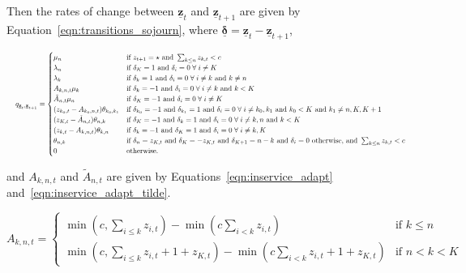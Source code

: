 \documentclass{article}
\begin{document}
Then the rates of change between $\underline{\mathbf{z}}_t$ and
$\underline{\mathbf{z}}_{t+1}$ are given by Equation~\ref{eqn:transitions_sojourn},
where $\underline{\mathbf{\delta}} = \underline{\mathbf{z}}_t - \underline{\mathbf{z}}_{t+1}$,

\begin{equation}\label{eqn:transitions_sojourn}
\resizebox{\textwidth}{!}{%
$q_{\underline{\mathbf{z}}_t, \underline{\mathbf{z}}_{t+1}} = 
\begin{cases}
\mu_n & \text{if } z_{t+1} = \star \text{ and } \sum_{k \leq n} z_{k, t} < c \\
\lambda_n & \text{if } \delta_K = 1 \text{ and } \delta_i = 0 \; \forall \; i \neq K \\
\lambda_k & \text{if } \delta_k = 1 \text{ and } \delta_i = 0 \; \forall \; i \neq k \text{ and } k \neq n\\
A_{k,n,t} \mu_k & \text{if } \delta_k = -1 \text{ and } \delta_i = 0 \; \forall \; i \neq k \text{ and } k < K\\
\tilde{A}_{n,t} \mu_n & \text{if } \delta_K = -1 \text{ and } \delta_i = 0 \; \forall \; i \neq K\\
(z_{k_0,t} - A_{k_0,n,t}) \theta_{k_0,k_1} & \text{if } \delta_{k_0} = -1 \text{ and } \delta_{k_1} = 1 \text{ and } \delta_i = 0 \; \forall \; i \neq k_0, k_1 \text{ and } k_0 < K \text{ and } k_1 \neq n, K, K+1 \\
(z_{K,t} - \tilde{A}_{n,t}) \theta_{n,k} & \text{if } \delta_K = -1 \text{ and } \delta_{k} = 1 \text{ and } \delta_i = 0 \; \forall \; i \neq k, n \text{ and } k < K \\
(z_{k,t} - A_{k,n,t}) \theta_{k,n} & \text{if } \delta_k = -1 \text{ and } \delta_K = 1 \text{ and } \delta_i = 0 \; \forall \; i \neq k, K \\
\theta_{n, k} & \text{if } \delta_n = z_{K,t} \text{ and } \delta_K = -z_{K,t} \text{ and } \delta_{K+1} = n - k \text{ and } \delta_i = 0 \text{ otherwise, and } \sum_{k \leq n} z_{k, t} < c \\
0 & \text{otherwise.}
\end{cases}$%
}
\end{equation}

and $A_{k,n,t}$ and $\tilde{A}_{n, t}$ are given by
Equations~\ref{eqn:inservice_adapt} and~\ref{eqn:inservice_adapt_tilde}.

\begin{equation}\label{eqn:inservice_adapt}
A_{k,n,t} =
\begin{cases}
\min\left(c, \sum_{i \leq k} z_{i,t}\right) - \min\left(c \sum_{i < k} z_{i,t}\right) & \text{if } k \leq n \\
\min\left(c, \sum_{i \leq k} z_{i,t} + 1 + z_{K,t}\right) - \min\left(c \sum_{i < k} z_{i,t} + 1 + z_{K,t}\right) & \text{if } n < k < K
\end{cases}
\end{equation}
\end{document}
